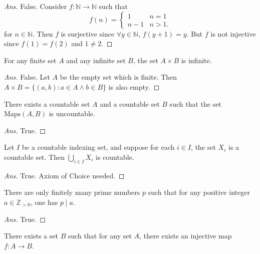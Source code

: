 \documentclass[12pt]{article}
\newenvironment{problem}[2][Problem]{\begin{trivlist}
\item[\hskip \labelsep {\bfseries #1}\hskip \labelsep {\bfseries #2.}]}{\end{trivlist}}
\begin{document}
\begin{proof}[Ans]
False. Consider $f : \mathbb{N} \to \mathbb{N}$ such that
\[f(n) = \begin{cases}
    1 & n = 1 \\
    n - 1 & n > 1.
\end{cases}\]
for $n \in \mathbb{N}$. Then $f$ is surjective since $\forall y \in \mathbb{N}$, $f(y + 1) = y$. But $f$ is not injective since $f (1) = f(2)$ and $1 \neq 2$.
\end{proof}

\begin{problem}{6}
For any finite set $A$ and any infinite set $B$, the set $A \times B$ is infinite.
\end{problem}

\begin{proof}[Ans]
False. Let $A$ be the empty set which is finite. Then $A \times B = \{(a, b) : a \in A \land b \in B\}$ is also empty.

\end{proof}

\begin{problem}{7}
There exists a countable set $A$ and a countable set $B$ such that the set $\text{Maps}(A, B)$ is uncountable.
\end{problem}

\begin{proof}[Ans]
True.

\end{proof}

\begin{problem}{8}
Let $I$ be a countable indexing set, and suppose for each $i \in I$, the set $X_i$ is a countable set. Then $\bigcup_{i \in I} X_i$ is countable.
\end{problem}

\begin{proof}[Ans]
True. Axiom of Choice needed.
\end{proof}

\begin{problem}{9}
There are only finitely many prime numbers $p$ such that
for any positive integer $a \in \mathbb{Z}_{>0}$, one has $p \mid a$.
\end{problem}

\begin{proof}[Ans]
True.
\end{proof}

\begin{problem}{10}
There exists a set $B$ such that for any set $A$, there exists an injective map
$f : A \rightarrow B$.

\end{problem}
\end{document}
